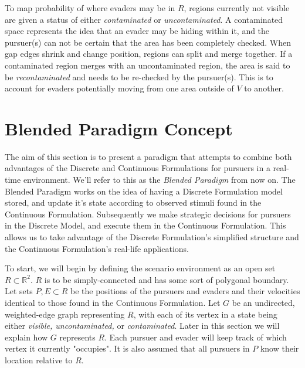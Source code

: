 \documentclass{article}
\begin{document}
To map probability of where evaders may be in \(R\), regions currently not visible are given a status of either \emph{contaminated} or \emph{uncontaminated}. A contaminated space represents the idea that an evader may be hiding within it, and the pursuer(s) can not be certain that the area has been completely checked. When gap edges shrink and change position, regions can split and merge together. If a contaminated region merges with an uncontaminated region, the area is said to be \emph{recontaminated} and needs to be re-checked by the pursuer(s). This is to account for evaders potentially moving from one area outside of \(V\) to another.

\section{Blended Paradigm Concept}
The aim of this section is to present a paradigm that attempts to combine both advantages of the Discrete and Continuous Formulations for pursuers in a real-time environment. We'll refer to this as the \emph{Blended Paradigm} from now on. The Blended Paradigm works on the idea of having a Discrete Formulation model stored, and update it's state according to observed stimuli found in the Continuous Formulation. Subsequently we make strategic decisions for pursuers in the Discrete Model, and execute them in the Continuous Formulation. This allows us to take advantage of the Discrete Formulation's simplified structure and the Continuous Formulation's real-life applications.

To start, we will begin by defining the scenario environment as an open set \(R\subset\mathbb{R}^2\). \(R\) is to be simply-connected and has some sort of polygonal boundary. Let sets \(P,E\subset{R}\) be the positions of the pursuers and evaders and their velocities identical to those found in the Continuous Formulation. Let \(G\) be an undirected, weighted-edge graph representing \(R\), with each of its vertex in a state being either \emph{visible, uncontaminated,} or \emph{contaminated}. Later in this section we will explain how \(G\) represents \(R\). Each pursuer and evader will keep track of which vertex it currently "occupies". It is also assumed that all pursuers in \(P\) know their location relative to \(R\).
\end{document}
